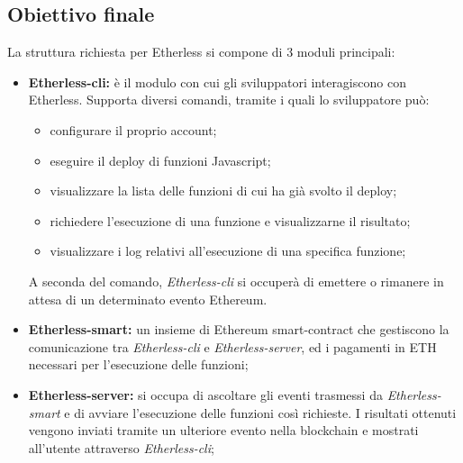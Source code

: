 \subsection{Obiettivo finale}
La struttura richiesta per Etherless si compone di 3 moduli principali: 
\begin{itemize}
	\item \textbf{Etherless-cli}\textbf{:} è il modulo con cui gli sviluppatori interagiscono con Etherless. Supporta diversi comandi, tramite i quali lo sviluppatore può: 
		\begin{itemize}
			\item configurare il proprio account; 
			\item eseguire il deploy di funzioni Javascript; 
			\item visualizzare la lista delle funzioni di cui ha già svolto il deploy; 
			\item richiedere l'esecuzione di una funzione e visualizzarne il risultato; 
			\item visualizzare i log relativi all'esecuzione di una specifica funzione; 
		\end{itemize}  
	A seconda del comando, \textit{Etherless-cli} si occuperà di emettere o rimanere in attesa di un determinato evento Ethereum. 
	
	\item \textbf{Etherless-smart:} un insieme di Ethereum smart-contract che gestiscono la comunicazione tra \textit{Etherless-cli} e \textit{Etherless-server}, ed i pagamenti in ETH necessari per l'esecuzione delle funzioni; 
	\item \textbf{Etherless-server:} si occupa di ascoltare gli eventi trasmessi da \textit{Etherless-smart} e di avviare l'esecuzione delle funzioni così richieste. I risultati ottenuti vengono inviati tramite un ulteriore evento nella blockchain e mostrati all'utente attraverso \textit{Etherless-cli};  
\end{itemize}

